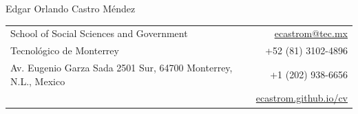 \documentclass[11pt]{article}
\begin{document}
{\LARGE Edgar Orlando Castro Méndez}\par
\vspace{6pt}
\begin{tabularx}{\textwidth}{@{}X r@{}}
School of Social Sciences and Government & \href{mailto:ecastrom@tec.mx}{ecastrom@tec.mx} \\
Tecnológico de Monterrey & +52 (81) 3102-4896 \\
Av. Eugenio Garza Sada 2501 Sur, 64700 Monterrey, N.L., Mexico & +1 (202) 938-6656 \\
 & \href{https://ecastrom.github.io/cv/main}{ecastrom.github.io/cv} \\
\end{tabularx}


\end{document}
